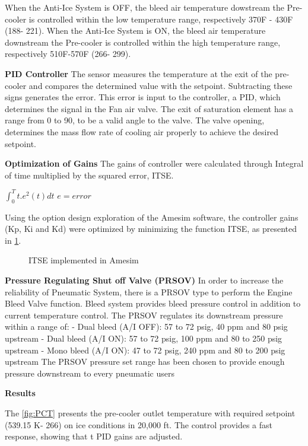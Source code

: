 When the Anti-Ice System is OFF, the bleed air temperature dowstream the Pre-cooler is controlled within the low temperature range, respectively 370\degree F - 430\degree F (188\celsius- 221\celsius). When the Anti-Ice System is ON, the bleed air temperature downstream the Pre-cooler is controlled within the high temperature range, respectively 510\degree F-570\degree F (266\celsius - 299\celsius).

\textbf{PID Controller
}
The sensor measures the temperature at the exit of the pre-cooler and compares the determined value with the setpoint. Subtracting these signs generates the error. This error is input to the controller, a PID, which determines the signal in the Fan air valve. The exit of saturation element has a range from 0 to 90, to be a valid angle to the valve. The valve opening, determines the mass flow rate of cooling air properly to achieve the desired setpoint.

\textbf{Optimization of Gains
}
The gains of controller were calculated through Integral of time multiplied by the squared error, ITSE.

$\int_{0}^{T}t.e^{2}\left ( t \right )dt$
$e=error$

Using the option design exploration of the Amesim software, the controller gains (Kp, Ki and Kd) were optimized by minimizing the function ITSE, as presented in \ref{fig:ITSE}.

\begin{figure}[H] %
\caption{ITSE implemented in Amesim}
\label{fig:ITSE}
\end{figure}

\textbf{Pressure Regulating Shut off Valve (PRSOV)
}
In order to increase the reliability of Pneumatic System, there is a PRSOV type to perform the Engine Bleed Valve function. Bleed system provides bleed pressure control in addition to current temperature control. The PRSOV regulates its downstream pressure within a range of:
- Dual bleed (A/I OFF): 57 to 72 psig, 40 ppm and 80 psig upstream
- Dual bleed (A/I ON): 57 to 72 psig, 100 ppm and 80 to 250 psig upstream
- Mono bleed (A/I ON): 47 to 72 psig, 240 ppm and 80 to 200 psig upstream
The PRSOV pressure set range has been chosen to provide enough pressure downstream to every pneumatic users

\textbf{Results}

The \ref{fig:PCT} presents the pre-cooler outlet temperature with required setpoint (539.15 K- 266\celsius) on ice conditions in 20,000 ft. The control provides a fast response, showing that t PID gains are adjusted.

